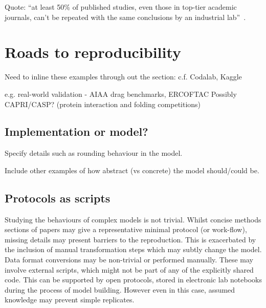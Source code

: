 \documentclass[conference]{IEEEtran}
\begin{document}
Quote: ``at least 50\% of published studies, even those in top-tier
academic journals, can't be repeated with the same conclusions by an
industrial lab''~\cite{osherovich:2011}.



\section{Roads to reproducibility}


Need to inline these examples through out the section: 
	c.f. Codalab, Kaggle

	e.g. real-world validation - AIAA drag benchmarks, ERCOFTAC
	Possibly CAPRI/CASP? (protein interaction and folding competitions)


\subsection{Implementation or model?}

Specify details such as rounding behaviour in the model.

Include other examples of how abstract (vs concrete) the model should/could be. 




\subsection{Protocols as scripts}



Studying the behaviours of complex models is not trivial. Whilst 
concise methods sections of papers may give a representative minimal
protocol (or work-flow), missing details may present barriers to 
the reproduction. This is exacerbated by the inclusion of manual 
transformation steps which may subtly change the model. Data format 
conversions may be non-trivial or performed manually. These may 
involve external scripts, which might not be part of any of the
explicitly shared code. This can be supported by open protocols, stored 
in electronic lab notebooks during the process of model building. However
even in this case, assumed knowledge may prevent simple replicates.
\end{document}
